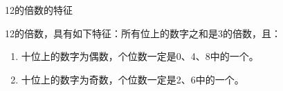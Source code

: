 \documentclass[aspectratio=169]{ctexbeamer} %
\date{\today}
\begin{document}
\begin{frame}[t]{12的倍数的特征}
\begin{spacing}{1.2}
\normalsize
12的倍数，具有如下特征：所有位上的数字之和是3的倍数，且：
\begin{enumerate}[label={\arabic*.}]
\item 十位上的数字为偶数，个位数一定是0、4、8中的一个。
\item 十位上的数字为奇数，个位数一定是2、6中的一个。
\end{enumerate}

\end{spacing}
\end{frame}
\end{document}

